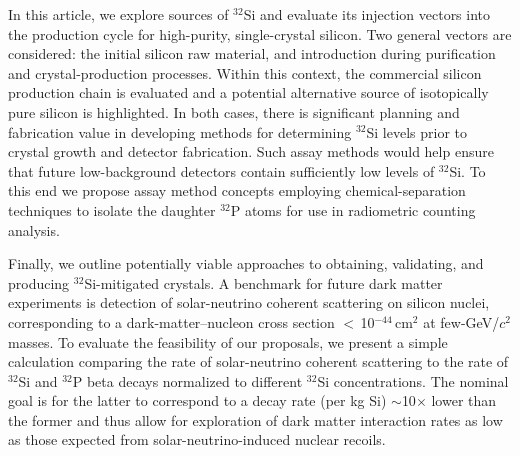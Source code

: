 \documentclass[final,5p]{elsarticle}
\def\si{$^{32}$Si\xspace}
\def\p{$^{32}$P\xspace}
\begin{document}
In this article, we explore sources of \si and evaluate its injection vectors into the production cycle for high-purity, single-crystal silicon.
Two general vectors are considered: the initial silicon raw material, and introduction during purification and crystal-production processes. Within this context, the commercial silicon production chain is evaluated and a potential alternative source of isotopically pure silicon is highlighted. In both cases, there is significant planning and fabrication value in developing methods for determining \si levels prior to crystal growth and detector fabrication. Such assay methods would help ensure that future low-background detectors contain sufficiently low levels of \si. To this end we propose assay method concepts employing chemical-separation techniques to isolate the daughter \p atoms for use in radiometric counting analysis. 

Finally, we outline potentially viable approaches to obtaining, validating, and producing \si-mitigated crystals. A benchmark for future dark matter experiments is detection of solar-neutrino coherent scattering on silicon nuclei, corresponding to a dark-matter--nucleon cross section $<$\,10$^{-44}$\,cm$^{2}$ at few-GeV/$c^2$ masses. To evaluate the feasibility of our proposals, we present a simple calculation comparing the rate of solar-neutrino coherent scattering to the rate of \si and \p beta decays normalized to different \si concentrations. The nominal goal is for the latter to correspond to a decay rate (per kg Si) $\sim$10$\times$ lower than the former and thus allow for exploration of dark matter interaction rates as low as those expected from solar-neutrino-induced nuclear recoils. 
\end{document}
